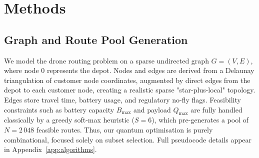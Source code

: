 





\section{Methods}\label{sec:methods}

\subsection{Graph and Route Pool Generation}\label{sec:graph}

We model the drone routing problem on a sparse undirected graph \(G=(V,E)\), where node \(0\) represents the depot. Nodes and edges are derived from a Delaunay triangulation of customer node coordinates, augmented by direct edges from the depot to each customer node, creating a realistic sparse "star-plus-local" topology. Edges store travel time, battery usage, and regulatory no-fly flags. Feasibility constraints such as battery capacity \(B_{\max}\) and payload \(Q_{\max}\) are fully handled classically by a greedy soft-max heuristic (\(S=6\)), which pre-generates a pool of \(N=2\,048\) feasible routes. Thus, our quantum optimisation is purely combinational, focused solely on subset selection. Full pseudocode details appear in Appendix~\ref{app:algorithms}.

